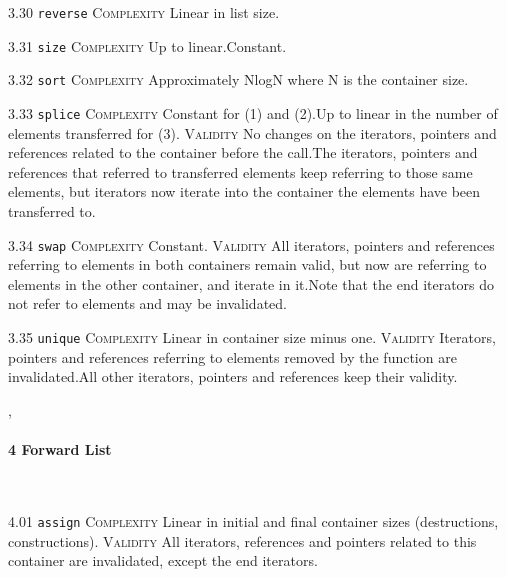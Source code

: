 \noindent\textcolor{corange}{3.30 \texttt{reverse}} \textsc{Complexity} Linear in list size. \vspace{0.5em}

\noindent\textcolor{corange}{3.31 \texttt{size}} \textsc{Complexity} Up to linear.Constant. \vspace{0.5em}

\noindent\textcolor{cred}{3.32 \texttt{sort}} \textsc{Complexity} Approximately NlogN where N is the container size. \vspace{0.5em}

\noindent\textcolor{corange}{3.33 \texttt{splice}} \textsc{Complexity} Constant for (1) and (2).Up to linear in the number of elements transferred for (3). \textsc{Validity} No changes on the iterators, pointers and references related to the container before the call.The iterators, pointers and references that referred to transferred elements keep referring to those same elements, but iterators now iterate into the container the elements have been transferred to.\vspace{0.5em}

\noindent\textcolor{cgreen}{3.34 \texttt{swap}} \textsc{Complexity} Constant. \textsc{Validity} All iterators, pointers and references referring to elements in both containers remain valid, but now are referring to elements in the other container, and iterate in it.Note that the end iterators do not refer to elements and may be invalidated.\vspace{0.5em}

\noindent\textcolor{corange}{3.35 \texttt{unique}} \textsc{Complexity} Linear in container size minus one. \textsc{Validity} Iterators, pointers and references referring to elements removed by the function are invalidated.All other iterators, pointers and references keep their validity.\vspace{0.5em}


\sep
{}
\paragraph{4 Forward List}\mbox{}\\
\noindent\textcolor{corange}{4.01 \texttt{assign}} \textsc{Complexity} Linear in initial and final container sizes (destructions, constructions). \textsc{Validity} All iterators, references and pointers related to this container are invalidated, except the end iterators.\vspace{0.5em}

